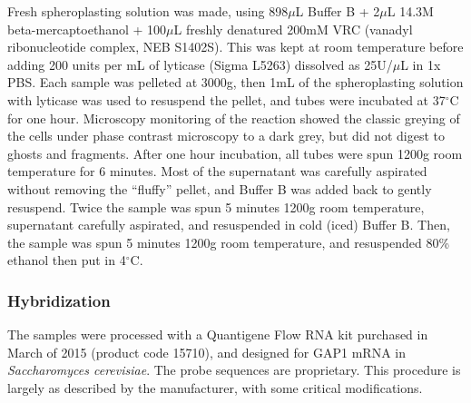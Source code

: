 {Fresh spheroplasting solution was made, using 898\(\mu\)L Buffer B +
2\(\mu\)L 14.3M beta-mercaptoethanol + 100\(\mu\)L freshly denatured
200mM VRC (vanadyl ribonucleotide complex, NEB S1402S). This was kept at
room temperature before adding 200 units per mL of lyticase (Sigma
L5263) dissolved as 25U/\(\mu\)L in 1x PBS. Each sample was pelleted at
3000g, then 1mL of the spheroplasting solution with lyticase was used to
resuspend the pellet, and tubes were incubated at 37\(^{\circ}\)C for
one hour. Microscopy monitoring of the reaction showed the classic
greying of the cells under phase contrast microscopy to a dark grey, but
did not digest to ghosts and fragments. After one hour incubation, all
tubes were spun 1200g room temperature for 6 minutes. Most of the
supernatant was carefully aspirated without removing the ``fluffy''
pellet, and Buffer B was added back to gently resuspend. Twice the
sample was spun 5 minutes 1200g room temperature, supernatant carefully
aspirated, and resuspended in cold (iced) Buffer B. Then, the sample was
spun 5 minutes 1200g room temperature, and resuspended 80\% ethanol then
put in 4\(^{\circ}\)C.

\subsubsection{Hybridization}\label{hybridization}

The samples were processed with a Quantigene Flow RNA kit purchased in
March of 2015 (product code 15710), and designed for GAP1 mRNA in
\emph{Saccharomyces cerevisiae}. The probe sequences are proprietary.
This procedure is largely as described by the manufacturer, with some
critical modifications.

}
